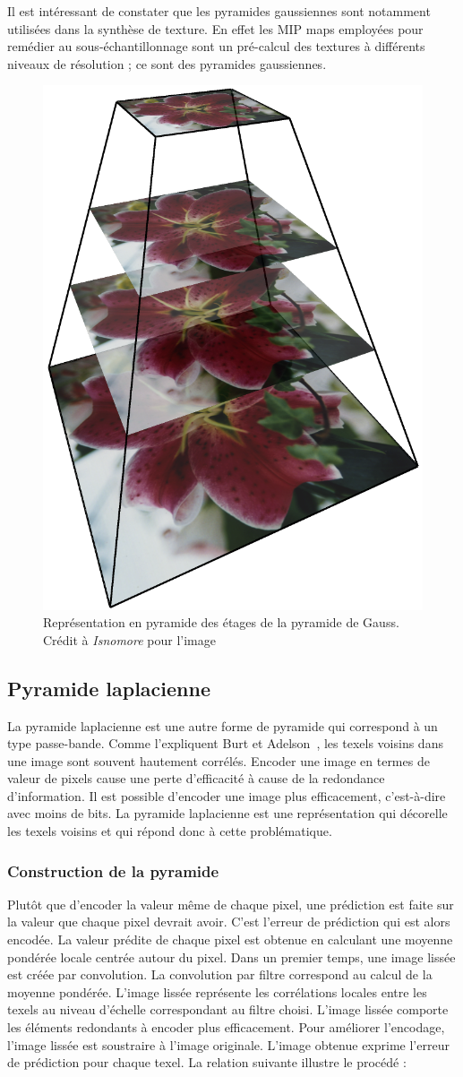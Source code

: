 Il est intéressant de constater que les pyramides gaussiennes sont notamment utilisées dans la synthèse de texture. En effet les MIP maps employées pour remédier au sous-échantillonnage sont un pré-calcul des textures à différents niveaux de résolution ; ce sont des pyramides gaussiennes.

\begin{figure}
    \centering
    \includegraphics[width=.25\textwidth]{contenu/resources/images/image_pyramid_placeholder}
    \caption[Représentation pyramidale des étages de la pyramide de Gauss]{Représentation en pyramide des étages de la pyramide de Gauss. Crédit à \textit{Isnomore} pour l'image}
    \label{fig:pyramid-gauss}
\end{figure}

\subsection{Pyramide laplacienne}

La \og pyramide laplacienne \fg est une autre forme de pyramide qui correspond à un type passe-bande. Comme l'expliquent Burt et Adelson~\cite{burt_laplacian_1983}, les texels voisins dans une image sont souvent hautement corrélés. Encoder une image en termes de valeur de pixels cause une perte d'efficacité à cause de la redondance d'information. Il est possible d'encoder une image plus efficacement, c'est-à-dire avec moins de bits. La pyramide laplacienne est une représentation qui décorelle les texels voisins et qui répond donc à cette problématique.

\subsubsection{Construction de la pyramide}

Plutôt que d'encoder la valeur même de chaque pixel, une prédiction est faite sur la valeur que chaque pixel devrait avoir. C'est l'erreur de prédiction qui est alors encodée. La valeur prédite de chaque pixel est obtenue en calculant une moyenne pondérée locale centrée autour du pixel. Dans un premier temps, une image lissée est créée par convolution. La convolution par filtre correspond au calcul de la moyenne pondérée. L'image lissée représente les corrélations locales entre les texels au niveau d'échelle correspondant au filtre choisi. L'image lissée comporte les éléments redondants à encoder plus efficacement. Pour améliorer l'encodage, l'image lissée est soustraire à l'image originale. L'image obtenue exprime l'erreur de prédiction pour chaque texel. La relation suivante illustre le procédé :

